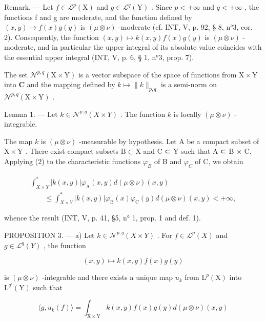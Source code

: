Remark. --- Let \(f \in \mathcal{L}^{p}(\mathrm{X})\) and \(g \in \mathcal{L}^{q}(\mathrm{Y})\) . Since \(p < +\infty\) and \(q < +\infty\) , the functions f and g are moderate, and the function defined by \((x, y) \mapsto f(x)g(y)\) is \((\mu \otimes \nu)\) -moderate (cf. INT, V, p. 92, § 8, n°3, cor. 2). Consequently, the function \((x, y) \mapsto k(x, y)f(x)g(y)\) is \((\mu \otimes \nu)\) -moderate, and in particular the upper integral of its absolute value coincides with the essential upper integral (INT, V, p. 6, § 1, n°3, prop. 7).

The set \(\mathcal{N}^{p,q}(\mathrm{X}\times \mathrm{Y})\) is a vector subspace of the space of functions from \(\mathrm{X}\times\mathrm{Y}\) into \(\mathbf{C}\) and the mapping defined by \(k\mapsto \| k\|_{p,q}\) is a semi-norm on \(\mathcal{N}^{p,q}(\mathrm{X}\times \mathrm{Y})\) .

Lemma 1. --- Let \(k \in \mathcal{N}^{p,q}(X \times Y)\) . The function \(k\) is locally \((\mu \otimes \nu)\) -integrable.

The map \(k\) is \((\mu \otimes \nu)\) -measurable by hypothesis. Let A be a compact subset of \(\mathrm{X} \times \mathrm{Y}\) . There exist compact subsets \(\mathrm{B} \subset \mathrm{X}\) and C ⊂ Y such that A ⊂ B × C. Applying (2) to the characteristic functions \(\varphi_{B}\) of B and \(\varphi_{C}\) of C, we obtain

\[
\begin{array}{l} \int_ {X \times Y} ^ {*} | k (x, y) | \varphi_ {\mathrm{A}} (x, y) d (\mu \otimes \nu) (x, y) \\ \qquad \leqslant \int_ {X \times Y} ^ {*} | k (x, y) | \varphi_ {\mathrm{B}} (x) \varphi_ {\mathrm{C}} (y) d (\mu \otimes \nu) (x, y) <   + \infty , \end{array}
\]

whence the result (INT, V, p. 41, §5, n° 1, prop. 1 and def. 1).

PROPOSITION 3. --- a) Let \(k \in \mathcal{N}^{p,q}(X \times Y)\) . For \(f \in \mathcal{L}^p(X)\) and \(g \in \mathcal{L}^q(Y)\) , the function

\[
(x, y) \mapsto k (x, y) f (x) g (y)
\]

is \((\mu \otimes \nu)\) -integrable and there exists a unique map \(u_{k}\) from \(\mathrm{L}^{p}(\mathrm{X})\) into \(\mathrm{L}^{q'}(\mathrm{Y})\) such that

\[
\langle g, u _ {k} (f) \rangle = \int_ {\mathrm{X} \times \mathrm{Y}} k (x, y) f (x) g (y) d (\mu \otimes \nu) (x, y)
\]

